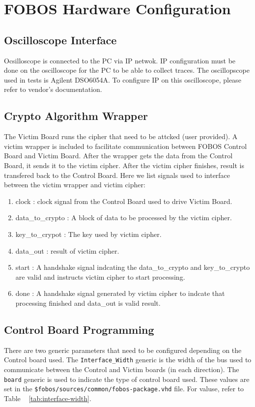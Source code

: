 \chapter{FOBOS Hardware Configuration} \label{chap:hardware-config}
\section{Oscilloscope Interface}
Ocsilloscope is connected to the PC via IP netwok. IP configuration must be done on the oscilloscope for the PC to be able to collect traces. The oscillopscope used in tests is Agilent DSO6054A. To configure IP on this oscilloscope, please refer to vendor's documentation.

\section{Crypto Algorithm Wrapper}
The Victim Board runs the cipher that need to be attcked (user provided). A victim wrapper is included to facilitate communication between FOBOS Control Board and Victim Board. After the wrapper gets the data from the Control Board, it sends it to the victim cipher. After the victim cipher finishes, result is transfered back to the Control Board.
Here we list signals used to interface between the victim wrapper and victim cipher:

\begin{enumerate}
\item clock : clock signal from the Control Board used to drive Victim Board.
\item data\_to\_crypto : A block of data to be processed by the victim cipher.
\item key\_to\_crypot : The key used by victim cipher.
\item data\_out : result of victim cipher.
\item start : A handshake signal indcating the data\_to\_crypto and key\_to\_crypto are valid and instructs victim cipher to start processing.
\item done : A handshake signal generated by victim cipher to indcate that processing finished and data\_out is valid result.
\end{enumerate}

\section{Control Board Programming}

There are two generic parameters that need to be configured depending on the Control board used.
The \texttt{Interface\_Width} generic is the width of the bus used to communicate between the Control and Victim boards (in each direction). The \texttt{board} generic is used to indicate the type of control board used. These values are set in the \texttt{\$fobos/sources/common/fobos-package.vhd} file. For valuse, refer to Table ~ \ref{tab:interface-width}.

